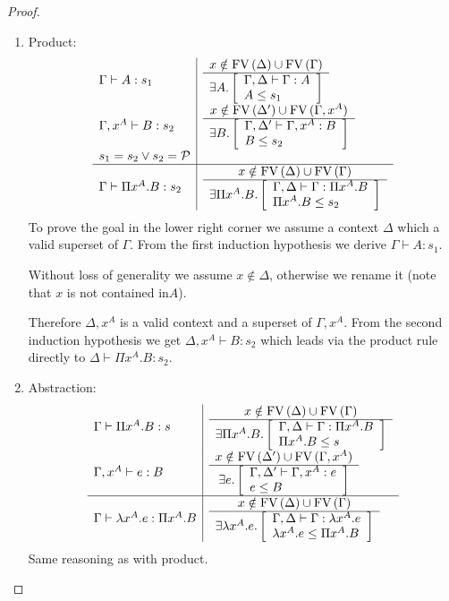\begin{lemma}
\begin{proof}
{\begin{enumerate}
\begin{enumerate}
                \item Product:
                $$
                \begin{array}{l|l}
                    \Gamma \vdash A: s_1
                    &
                    \goal \Delta \Gamma {A} {s_1}
                    \\
                    \Gamma,x^A \vdash B: s_2
                    &
                    \goal {\Delta'} {\Gamma,x^A} B {s_2}
                    \\
                    s_1 = s_2 \lor s_2 = \Prop
                    \\
                    \hline
                    \Gamma \vdash \Pi x^A.B : s_2
                    &
                    \goal \Delta \Gamma {\Pi x^A.B} {s_2}
                \end{array}
                $$
                To prove the goal in the lower right corner we assume a context
                    $\Delta$ which a valid superset of $\Gamma$. From the
                    first induction hypothesis we derive $\Gamma \vdash A: s_1$.

                Without loss of generality we assume $x \notin \Delta$,
                    otherwise we rename it (note that $x$ is not contained
                    in$A$).

                Therefore $\Delta, x^A$ is a valid context and a superset of
                    $\Gamma, x^A$. From the second induction hypothesis we get
                    $\Delta, x^A \vdash B: s_2$ which leads via the product rule
                    directly to $\Delta \vdash \Pi x^A. B: s_2$.

                \item Abstraction:
                $$
                \begin{array}{l|l}
                    \Gamma \vdash \Pi x^A. B: s
                    &
                    \goal \Delta \Gamma {\Pi x^A.B} s
                    \\
                    \Gamma,x^A \vdash e: B
                    &
                    \goal {\Delta'} {\Gamma, x^A} e B
                    \\
                    \hline
                    \Gamma \vdash \lambda x^A. e: \Pi x^A. B
                    &
                    \goal \Delta \Gamma {\lambda x^A. e} {\Pi x^A. B}
                \end{array}
                $$
                Same reasoning as with product.


\end{enumerate}
\end{enumerate}}
\end{proof}
\end{lemma}
